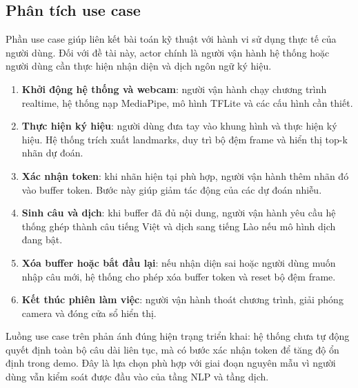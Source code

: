 ﻿\subsection{Phân tích use case}

Phần use case giúp liên kết bài toán kỹ thuật với hành vi sử dụng thực tế của người dùng. Đối với đề tài này, actor chính là người vận hành hệ thống hoặc người dùng cần thực hiện nhận diện và dịch ngôn ngữ ký hiệu.

\begin{enumerate}
    \item \textbf{Khởi động hệ thống và webcam}: người vận hành chạy chương trình realtime, hệ thống nạp MediaPipe, mô hình TFLite và các cấu hình cần thiết.
    \item \textbf{Thực hiện ký hiệu}: người dùng đưa tay vào khung hình và thực hiện ký hiệu. Hệ thống trích xuất landmarks, duy trì bộ đệm frame và hiển thị top-k nhãn dự đoán.
    \item \textbf{Xác nhận token}: khi nhãn hiện tại phù hợp, người vận hành thêm nhãn đó vào buffer token. Bước này giúp giảm tác động của các dự đoán nhiễu.
    \item \textbf{Sinh câu và dịch}: khi buffer đã đủ nội dung, người vận hành yêu cầu hệ thống ghép thành câu tiếng Việt và dịch sang tiếng Lào nếu mô hình dịch đang bật.
    \item \textbf{Xóa buffer hoặc bắt đầu lại}: nếu nhận diện sai hoặc người dùng muốn nhập câu mới, hệ thống cho phép xóa buffer token và reset bộ đệm frame.
    \item \textbf{Kết thúc phiên làm việc}: người vận hành thoát chương trình, giải phóng camera và đóng cửa sổ hiển thị.
\end{enumerate}

Luồng use case trên phản ánh đúng hiện trạng triển khai: hệ thống chưa tự động quyết định toàn bộ câu dài liên tục, mà có bước xác nhận token để tăng độ ổn định trong demo. Đây là lựa chọn phù hợp với giai đoạn nguyên mẫu vì người dùng vẫn kiểm soát được đầu vào của tầng NLP và tầng dịch.

